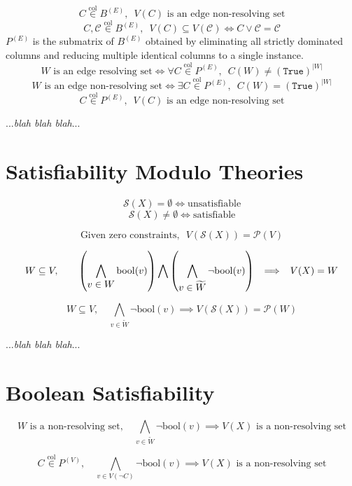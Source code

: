 \documentclass{article}
\newcommand{\combine}[7]{#1 #2 \vphantom{#6} #3 #4 #5 #6 \vphantom{#2} #7}
\begin{document}
\[ C \overset{\mathrm{col}}{\in} B^{(E)},\enspace V(C) \text{ is an edge non-resolving set} \]
\[ C, \mathcal{C} \overset{\mathrm{col}}{\in} B^{(E)},\enspace V(C) \subseteq V(\mathcal{C}) \iff C \vee \mathcal{C} = \mathcal{C} \]
\(P^{(E)}\) is the submatrix of \(B^{(E)}\) obtained by eliminating all strictly dominated columns and reducing multiple identical columns to a single instance.
\[ W \text{ is an edge resolving set} \iff \forall C \overset{\mathrm{col}}{\in} P^{(E)},\enspace C(W) \neq (\mathtt{True})^{|W|} \]
\[ W \text{ is an edge non-resolving set} \iff \exists C \overset{\mathrm{col}}{\in} P^{(E)},\enspace C(W) = (\mathtt{True})^{|W|} \]
\[ C \overset{\mathrm{col}}{\in} P^{(E)},\enspace V(C) \text{ is an edge non-resolving set} \]

...\textit{blah blah blah}...

\clearpage
\section{Satisfiability Modulo Theories}

\[ \mathcal{S}(X) = \emptyset \iff \text{unsatisfiable} \]
\[ \mathcal{S}(X) \neq \emptyset \iff \text{satisfiable} \]

\[ \text{Given zero constraints},\enspace V(\mathcal{S}(X)) = \mathcal{P}(V) \]

\[ W \subseteq V,\qquad \combine{\left(}{\bigwedge \limits_{\displaystyle v \in W} \mathrm{bool}(v)}{\right)}{\bigwedge}{\left(}{\bigwedge \limits_{\displaystyle v \in \widetilde{W}} \neg \mathrm{bool}(v)}{\right)}\enspace \implies\enspace V(X) = W \]

\[ W \subseteq V,\quad \bigwedge \limits_{\displaystyle v \in \widetilde{W}} \neg \mathrm{bool}(v) \implies V(\mathcal{S}(X)) = \mathcal{P}(W) \]

...\textit{blah blah blah}...

\clearpage
\section{Boolean Satisfiability}

\[ W \text{ is a non-resolving set},\quad \bigwedge \limits_{\displaystyle v \in \widetilde{W}} \neg \mathrm{bool}(v) \implies V(X) \text{ is a non-resolving set} \]

\[ C \overset{\mathrm{col}}{\in} P^{(V)},\quad \bigwedge \limits_{\displaystyle v \in V(\neg C)} \neg \mathrm{bool}(v) \implies V(X) \text{ is a non-resolving set} \]
\end{document}

